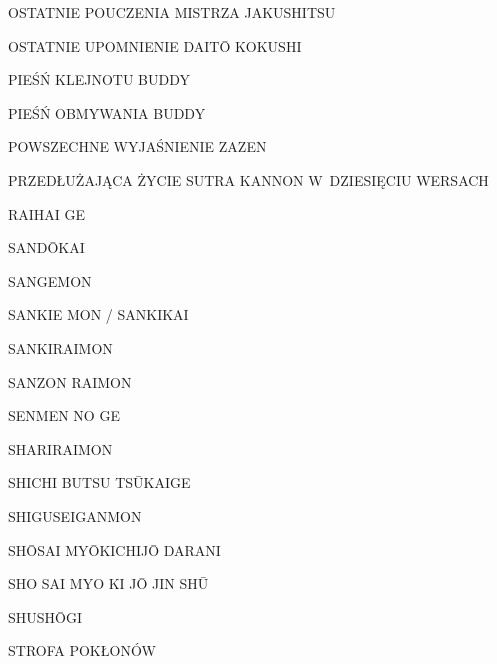 \par\noindent OSTATNIE POUCZENIA MISTRZA JAKUSHITSU \dotfill \makebox[1.0cm][r]{\pageref{ostatnie_pouczenia_mistrza_jakushitsu}}
\par\noindent OSTATNIE UPOMNIENIE DAIT\=O KOKUSHI \dotfill \makebox[1.0cm][r]{\pageref{ostatnie_upomnienie}}
\par\noindent PIEŚŃ KLEJNOTU BUDDY \dotfill \makebox[1.0cm][r]{\pageref{piesn_klejnotu_buddy}}
\par\noindent PIEŚŃ OBMYWANIA BUDDY \dotfill \makebox[1.0cm][r]{\pageref{piesn_obmywania_buddy}}
\par\noindent POWSZECHNE WYJAŚNIENIE ZAZEN \dotfill \makebox[1.0cm][r]{\pageref{ogolne_zalecenia}}
\par\noindent PRZEDŁUŻAJĄCA ŻYCIE SUTRA KANNON W~DZIESIĘCIU WERSACH \dotfill \makebox[1.0cm][r]{\pageref{sutra_kannon}}
\par\noindent RAIHAI GE \dotfill \makebox[1.0cm][r]{\pageref{raihaige}}
\par\noindent SAND\=OKAI \dotfill \makebox[1.0cm][r]{\pageref{sandokai}}
\par\noindent SANGEMON \dotfill \makebox[1.0cm][r]{\pageref{sangemon}}
\par\noindent SANKIE MON / SANKIKAI \dotfill \makebox[1.0cm][r]{\pageref{sankiemon}}
\par\noindent SANKIRAIMON \dotfill \makebox[1.0cm][r]{\pageref{sankiraimon}}
\par\noindent SANZON RAIMON \dotfill \makebox[1.0cm][r]{\pageref{sanzonraimon}}
\par\noindent SENMEN NO GE \dotfill \makebox[1.0cm][r]{\pageref{senmen_no_ge}}
\par\noindent SHARIRAIMON \dotfill \makebox[1.0cm][r]{\pageref{shariraimon}}
\par\noindent SHICHI BUTSU TS\=UKAIGE \dotfill \makebox[1.0cm][r]{\pageref{shichi_butsu_tsukaige}}
\par\noindent SHIGUSEIGANMON \dotfill \makebox[1.0cm][r]{\pageref{shiguseiganmon}}
\par\noindent SH\=OSAI MY\=OKICHIJ\=O DARANI \dotfill \makebox[1.0cm][r]{\pageref{sio_saj_mio}}
\par\noindent SHO SAI MYO KI J\=O JIN SH\=U \dotfill \makebox[1.0cm][r]{\pageref{sho_sai_myo_ki_jo}}
\par\noindent SHUSH\=OGI \dotfill \makebox[1.0cm][r]{\pageref{shushogi}}
\par\noindent STROFA POKŁONÓW \dotfill \makebox[1.0cm][r]{\pageref{strofa_poklonow}}
